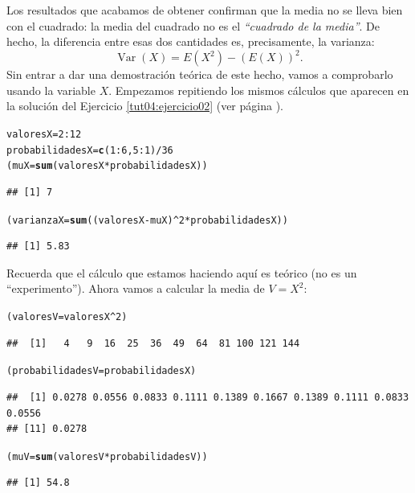 \documentclass[10pt,a4paper]{article}\usepackage[]{graphicx}\usepackage[]{color}
\makeatletter
\newcommand{\hlnum}[1]{\textcolor[rgb]{0.686,0.059,0.569}{#1}}%
\newcommand{\hlopt}[1]{\textcolor[rgb]{0,0,0}{#1}}%
\newcommand{\hlstd}[1]{\textcolor[rgb]{0.345,0.345,0.345}{#1}}%
\newcommand{\hlkwb}[1]{\textcolor[rgb]{0.69,0.353,0.396}{#1}}%
\newcommand{\hlkwd}[1]{\textcolor[rgb]{0.737,0.353,0.396}{\textbf{#1}}}%
\newenvironment{kframe}{%
 \def\at@end@of@kframe{}%
 \ifinner\ifhmode%
  \def\at@end@of@kframe{\end{minipage}}%
  \begin{minipage}{\columnwidth}%
 \fi\fi%
 \def\FrameCommand##1{\hskip\@totalleftmargin \hskip-\fboxsep
 \colorbox{shadecolor}{##1}\hskip-\fboxsep
     \hskip-\linewidth \hskip-\@totalleftmargin \hskip\columnwidth}%
 \MakeFramed {\advance\hsize-\width
   \@totalleftmargin\z@ \linewidth\hsize
   \@setminipage}}%
 {\par\unskip\endMakeFramed%
 \at@end@of@kframe}
\newenvironment{knitrout}{}{} %
\makeatother
\begin{document}
Los resultados que acabamos de obtener confirman que la media no se lleva bien con el cuadrado: la media del cuadrado no es el {\em ``cuadrado de la media''}. De hecho, la diferencia entre esas dos cantidades es, precisamente, la varianza:
\[\operatorname{Var}(X) = E(X^2) - \left(E(X)\right)^2.\]
Sin entrar a dar una demostración teórica de este hecho, vamos a comprobarlo usando la variable $X$. Empezamos repitiendo los mismos cálculos que aparecen en la solución del Ejercicio \ref{tut04:ejercicio02} (ver página \pageref{tut04:ejercicio02:sol}).
\begin{knitrout}
\color{fgcolor}\begin{kframe}
\begin{alltt}
\hlstd{valoresX} \hlkwb{=} \hlnum{2}\hlopt{:}\hlnum{12}
\hlstd{probabilidadesX} \hlkwb{=} \hlkwd{c}\hlstd{(}\hlnum{1}\hlopt{:}\hlnum{6}\hlstd{,}\hlnum{5}\hlopt{:}\hlnum{1}\hlstd{)} \hlopt{/} \hlnum{36}
\hlstd{(muX} \hlkwb{=} \hlkwd{sum}\hlstd{(valoresX} \hlopt{*} \hlstd{probabilidadesX))}
\end{alltt}
\begin{verbatim}
## [1] 7
\end{verbatim}
\begin{alltt}
\hlstd{(varianzaX} \hlkwb{=} \hlkwd{sum}\hlstd{((valoresX} \hlopt{-} \hlstd{muX)}\hlopt{^}\hlnum{2} \hlopt{*} \hlstd{probabilidadesX) )}
\end{alltt}
\begin{verbatim}
## [1] 5.83
\end{verbatim}
\end{kframe}
\end{knitrout}
Recuerda que el cálculo que estamos haciendo aquí es teórico (no es un ``experimento''). Ahora vamos a calcular la media de $V=X^2$:
\begin{knitrout}
\color{fgcolor}\begin{kframe}
\begin{alltt}
\hlstd{(valoresV} \hlkwb{=} \hlstd{valoresX}\hlopt{^}\hlnum{2}\hlstd{)}
\end{alltt}
\begin{verbatim}
##  [1]   4   9  16  25  36  49  64  81 100 121 144
\end{verbatim}
\begin{alltt}
\hlstd{(probabilidadesV} \hlkwb{=} \hlstd{probabilidadesX)}
\end{alltt}
\begin{verbatim}
##  [1] 0.0278 0.0556 0.0833 0.1111 0.1389 0.1667 0.1389 0.1111 0.0833 0.0556
## [11] 0.0278
\end{verbatim}
\begin{alltt}
\hlstd{(muV} \hlkwb{=} \hlkwd{sum}\hlstd{(valoresV} \hlopt{*} \hlstd{probabilidadesV))}
\end{alltt}
\begin{verbatim}
## [1] 54.8
\end{verbatim}
\end{kframe}
\end{knitrout}
\end{document}
